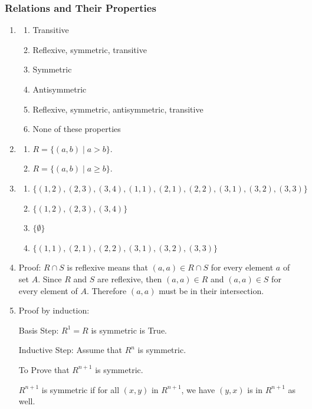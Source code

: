 \documentclass{sig-alternate-05-2015}
\begin{document}
\subsubsection{Relations and Their Properties}
\begin{enumerate}
\item
\begin{enumerate}
	\item Transitive
	\item Reflexive, symmetric, transitive
	\item Symmetric
	\item Antisymmetric
	\item Reflexive, symmetric, antisymmetric, transitive
	\item None of these properties
\end{enumerate}

\item 
\begin{enumerate}
	\item $R = \{(a, b) \mid a > b\}$.
	\item $R = \{(a, b) \mid a \ge b\}$.
\end{enumerate}

\item
\begin{enumerate}
	\item  $\{(1,2), (2,3), (3,4), (1,1), (2,1), (2,2), (3,1), (3,2), (3,3)\}$
	\item $\{(1,2), (2,3), (3,4)\}$
	\item $\{\emptyset\}$
	\item $\{(1,1), (2,1), (2,2), (3,1), (3,2), (3,3)\}$
\end{enumerate}

\item Proof: $R \cap S$ is reflexive means that $(a,a) \in R\cap S $ for every element $a$ of set $A$.
Since $R$ and $S$ are reflexive, then $(a,a)\in R $ and $(a,a)\in S$ for every element of $A$.
Therefore $(a,a)$ must be in their intersection.

\item Proof by induction:

Basis Step: $R^1= R$ is symmetric is True.

Inductive Step: Assume that $R^n$ is symmetric.

To Prove that $R^{n+1}$ is symmetric.

$R^{n+1}$ is symmetric if for all $(x,y)$ in $R^{n+1}$, we have $(y,x)$ is in $R^{n+1}$ as well.


\end{enumerate}
\end{document}
